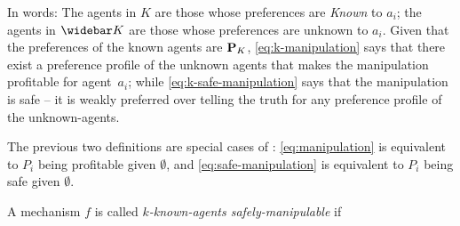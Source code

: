 In words: The agents in $K$ are those  whose preferences are \emph{Known} to $a_i$; the agents in $\notK$ are those whose preferences are unknown to $a_i$.
Given that the preferences of the known agents are $\mathbf{P}_{K}$, \eqref{eq:k-manipulation} says that there exist a preference profile of the unknown agents that makes the manipulation profitable for agent~$a_i$; while \eqref{eq:k-safe-manipulation} says that the manipulation is safe -- it is weakly preferred over telling the truth for any preference profile of the unknown-agents.

The previous two definitions are special cases of : \eqref{eq:manipulation} is equivalent to $P_i$ being profitable given $\emptyset$, and \eqref{eq:safe-manipulation} is equivalent to $P_i$ being safe given $\emptyset$.

%
%


%

\begin{definition}
A mechanism $f$ is called \emph{$k$-known-agents safely-manipulable} if 
\end{definition}

